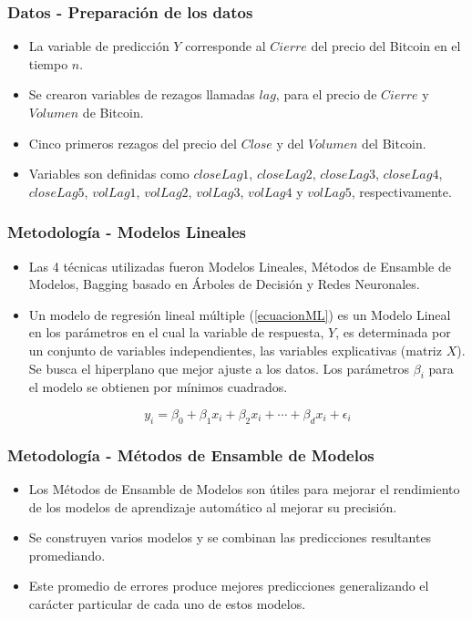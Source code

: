 \documentclass{beamer}
\begin{document}
\begin{frame}[t]
\frametitle{ Datos - Preparación de los datos}

\vfill
\begin{itemize}
\item 
La variable de predicción $Y$ corresponde al $Cierre$ del precio del Bitcoin en el tiempo $n$. 
\item 
Se crearon variables de rezagos llamadas $lag$, para el precio de $Cierre$ y $Volumen$ de Bitcoin.
\item 
Cinco primeros rezagos del precio del $Close$ y del $Volumen$ del Bitcoin. 
\item
Variables son definidas como $closeLag1$, $closeLag2$, $closeLag3$, $closeLag4$, $closeLag5$, $volLag1$, $volLag2$, $volLag3$, $volLag4$ y $volLag5$, respectivamente.

\vfill
\end{itemize}

\end{frame}
\begin{frame}[t]
\frametitle{ Metodología - Modelos Lineales}

\vfill
\begin{itemize}
\item 
Las 4 técnicas utilizadas fueron Modelos Lineales, Métodos de Ensamble de Modelos, Bagging basado en Árboles de Decisión y Redes Neuronales.
\item 
Un modelo de regresión lineal múltiple (\ref{ecuacionML}) es un Modelo Lineal en los parámetros en el cual la variable de respuesta, $Y$, es determinada por un conjunto de variables independientes, las variables explicativas (matriz $X$). Se busca el hiperplano que mejor ajuste a los datos. Los parámetros $\beta_i$ para el modelo se obtienen por mínimos cuadrados.

\begin{equation}
y_{i}=\beta_{0}+\beta_{1} x_{i}+\beta_{2} x_{i}+\cdots+\beta_{d} x_{i}+\epsilon_{i}
\label{ecuacionML}
\end{equation}
\vfill
\end{itemize}

\end{frame}

\begin{frame}[t]
\frametitle{Metodología - Métodos de Ensamble de Modelos}

\vfill
\begin{itemize}
\item 
Los Métodos de Ensamble de Modelos son útiles para mejorar el rendimiento de los modelos de aprendizaje automático al mejorar su precisión. 
\item 
Se construyen varios modelos y se combinan las predicciones resultantes promediando. 
\item 
Este promedio de errores produce mejores predicciones generalizando el carácter particular de cada uno de estos modelos.


\vfill
\end{itemize}

\end{frame}
\end{document}
